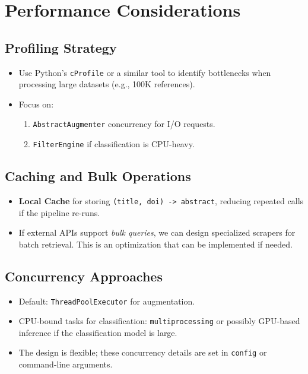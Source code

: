 \documentclass[12pt]{article}
\begin{document}
\section{Performance Considerations}

\subsection{Profiling Strategy}
\begin{itemize}
  \item Use Python’s \texttt{cProfile} or a similar tool to identify bottlenecks when processing large datasets (e.g., 100K references).
  \item Focus on:
    \begin{enumerate}
      \item \texttt{AbstractAugmenter} concurrency for I/O requests.
      \item \texttt{FilterEngine} if classification is CPU-heavy.
    \end{enumerate}
\end{itemize}

\subsection{Caching and Bulk Operations}
\begin{itemize}
  \item \textbf{Local Cache} for storing \texttt{(title, doi) -> abstract}, reducing repeated calls if the pipeline re-runs.
  \item If external APIs support \emph{bulk queries}, we can design specialized scrapers for batch retrieval. This is an optimization that can be implemented if needed.
\end{itemize}

\subsection{Concurrency Approaches}
\begin{itemize}
  \item Default: \texttt{ThreadPoolExecutor} for augmentation. 
  \item CPU-bound tasks for classification: \texttt{multiprocessing} or possibly GPU-based inference if the classification model is large.
  \item The design is flexible; these concurrency details are set in \texttt{config} or command-line arguments.
\end{itemize}
\end{document}
